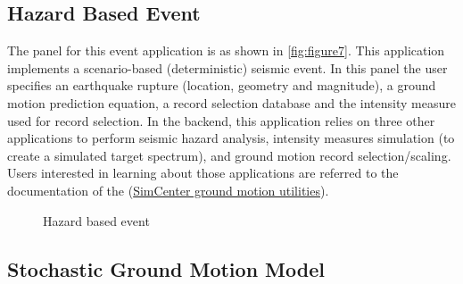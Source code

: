 \subsection{Hazard Based Event}
The panel for this event application is as shown
in \autoref{fig:figure7}.  This application implements a
scenario-based (deterministic) seismic event.  In this panel the user
specifies an earthquake rupture (location, geometry and magnitude), a
ground motion prediction equation, a record selection database and the
intensity measure used for record selection.  In the backend, this
application relies on three other applications to perform seismic
hazard analysis, intensity measures simulation (to create a simulated
target spectrum), and ground motion record selection/scaling.  Users
interested in learning about those applications are referred to the
documentation of the
(\href{https://github.com/NHERI-SimCenter/GroundMotionUtilities/blob/master/Readme.md}{SimCenter
ground motion utilities}).
\begin{figure}[!htbp]
  \caption{Hazard based event}
  \label{fig:figure7}
\end{figure}

\subsection{Stochastic Ground Motion Model}






